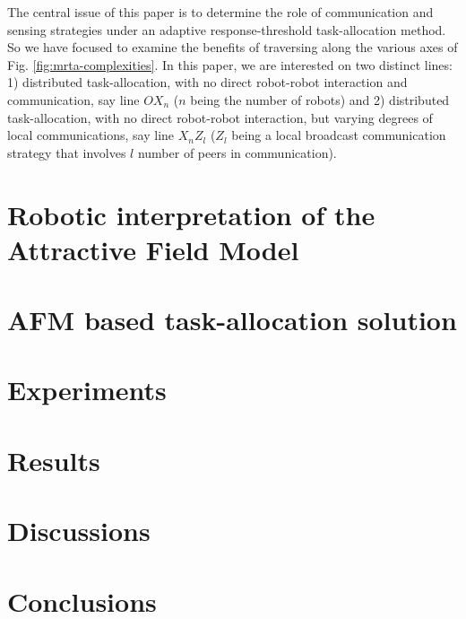 \documentclass[preprint,12pt]{elsarticle}
\begin{document}
The central issue of this paper is to determine the role of communication and sensing strategies under an adaptive response-threshold task-allocation method. So we have focused to examine the benefits of traversing along the various axes of Fig. \ref{fig:mrta-complexities}. In this paper, we are interested on two distinct lines: 1) distributed task-allocation, with no direct robot-robot interaction and communication, say line $OX_{n}$ ($n$ being the number of robots)  and 2) distributed task-allocation, with no direct robot-robot interaction, but varying degrees of local communications, say line $X_{n}Z_{l}$  ($Z_{l}$ being a local broadcast communication strategy that involves $l$ number of peers in communication).
\section{Robotic interpretation of the Attractive Field Model}
\label{sec:afm}
\section{AFM based task-allocation solution}
\label{sec:mrta}
\section{Experiments}
\label{sec:expt}
\section{Results}
\label{sec:res}
\section{Discussions}
\label{sec:discuss}
\section{Conclusions}
\label{sec:conc}



\end{document}

